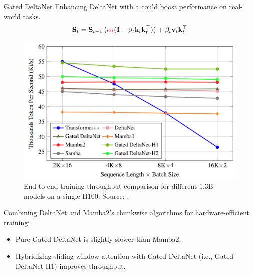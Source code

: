\begin{frame}{Gated DeltaNet}
    Enhancing DeltaNet with a {\color{red}{Mamba2-like gating mechanism}} could boost performance on {\color{red}real-world tasks}.
        \begin{align*}
            \mathbf{S}_t = \mathbf{S}_{t-1} \left({\color{red}\alpha_t}(\mathbf{I} - \beta_t \mathbf{k}_t \mathbf{k}_t^\top)\right) + \beta_t \mathbf{v}_t \mathbf{k}_t^\top
        \end{align*}
    \begin{table}[h!]
        \centering
        \caption{Performance comparison of different 1.3B models trained on 100B tokens. Source: \cite{yang2024gateddeltanetworksimproving}.}
        \label{tab:model_comparison}
    \end{table}
\end{frame}
\begin{frame}
    \begin{figure}
        \centering
        \includegraphics[width=0.65\linewidth]{figure/gdn-speed.png}
        \caption{End-to-end training throughput comparison for different 1.3B models on a single H100. Source: \cite{yang2024gateddeltanetworksimproving}.}
    \end{figure}
    Combining DeltaNet and Mamba2's chunkwise algorithms for hardware-efficient training:
    \begin{itemize}
    \item Pure Gated DeltaNet is slightly slower than Mamba2.  
    \item Hybridizing sliding window attention with Gated DeltaNet (i.e., Gated DeltaNet-H1) improves throughput.
\end{itemize}
\end{frame}

